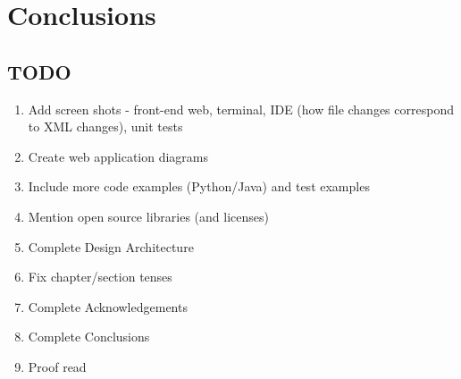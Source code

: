 \chapter{Conclusions}

\section{TODO}
\begin{enumerate}
\item Add screen shots - front-end web, terminal, IDE (how file changes correspond to XML changes), unit tests
\item Create web application diagrams
\item Include more code examples (Python/Java) and test examples
\item Mention open source libraries (and licenses)
\item Complete Design Architecture
\item Fix chapter/section tenses
\item Complete Acknowledgements
\item Complete Conclusions
\item Proof read
\end{enumerate}
